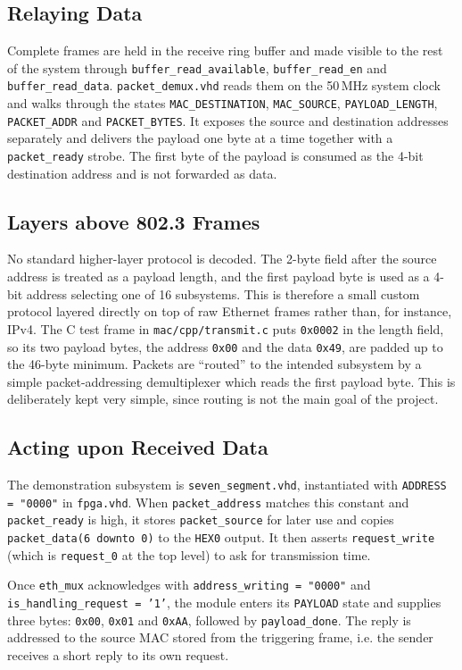 \documentclass[11pt,a4paper]{article}
\begin{document}
\subsection{Relaying Data}
Complete frames are held in the receive ring buffer and made visible to the rest of the system through \texttt{buffer\_read\_available}, \texttt{buffer\_read\_en} and \texttt{buffer\_read\_data}. \texttt{packet\_demux.vhd} reads them on the 50\,MHz system clock and walks through the states \texttt{MAC\_DESTINATION}, \texttt{MAC\_SOURCE}, \texttt{PAYLOAD\_LENGTH}, \texttt{PACKET\_ADDR} and \texttt{PACKET\_BYTES}. It exposes the source and destination addresses separately and delivers the payload one byte at a time together with a \texttt{packet\_ready} strobe. The first byte of the payload is consumed as the 4-bit destination address and is not forwarded as data.

\subsection{Layers above 802.3 Frames}
No standard higher-layer protocol is decoded. The 2-byte field after the source address is treated as a payload length, and the first payload byte is used as a 4-bit address selecting one of 16 subsystems. This is therefore a small custom protocol layered directly on top of raw Ethernet frames rather than, for instance, IPv4. The C test frame in \texttt{mac/cpp/transmit.c} puts \texttt{0x0002} in the length field, so its two payload bytes, the address \texttt{0x00} and the data \texttt{0x49}, are padded up to the 46-byte minimum. Packets are ``routed'' to the intended subsystem by a simple packet-addressing demultiplexer which reads the first payload byte. This is deliberately kept very simple, since routing is not the main goal of the project.

\subsection{Acting upon Received Data}
The demonstration subsystem is \texttt{seven\_segment.vhd}, instantiated with \texttt{ADDRESS = "0000"} in \texttt{fpga.vhd}. When \texttt{packet\_address} matches this constant and \texttt{packet\_ready} is high, it stores \texttt{packet\_source} for later use and copies \texttt{packet\_data(6 downto 0)} to the \texttt{HEX0} output. It then asserts \texttt{request\_write} (which is \texttt{request\_0} at the top level) to ask for transmission time.

Once \texttt{eth\_mux} acknowledges with \texttt{address\_writing = "0000"} and \texttt{is\_handling\_request = '1'}, the module enters its \texttt{PAYLOAD} state and supplies three bytes: \texttt{0x00}, \texttt{0x01} and \texttt{0xAA}, followed by \texttt{payload\_done}. The reply is addressed to the source MAC stored from the triggering frame, i.e. the sender receives a short reply to its own request.
\end{document}
